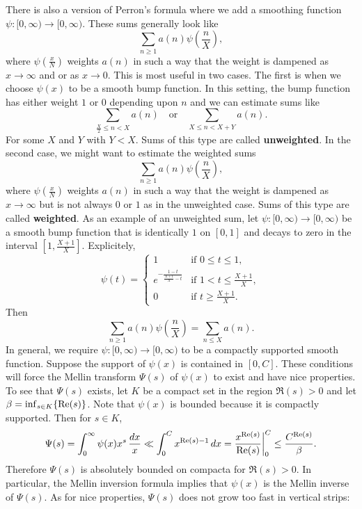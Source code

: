       There is also a version of Perron's formula where we add a smoothing function $\psi:[0,\infty) \to [0,\infty)$. These sums generally look like
      \[
        \sum_{n \ge 1}a(n)\psi\left(\frac{n}{X}\right),
      \]
      where $\psi\left(\frac{x}{N}\right)$ weights $a(n)$ in such a way that the weight is dampened as $x \to \infty$ and or as $x \to 0$. This is most useful in two cases. The first is when we choose $\psi(x)$ to be a smooth bump function. In this setting, the bump function has either weight $1$ or $0$ depending upon $n$ and we can estimate sums like
      \[
        \sum_{\frac{X}{2} \le n < X}a(n) \quad \text{or} \quad \sum_{X \le n < X+Y}a(n).
      \]
      For some $X$ and $Y$ with $Y < X$. Sums of this type are called \textbf{unweighted}. In the second case, we might want to estimate the weighted sums
      \[
        \sum_{n \ge 1}a(n)\psi\left(\frac{n}{X}\right),
      \]
      where $\psi\left(\frac{x}{N}\right)$ weights $a(n)$ in such a way that the weight is dampened as $x \to \infty$ but is not always $0$ or $1$ as in the unweighted case. Sums of this type are called \textbf{weighted}. As an example of an unweighted sum, let $\psi:[0,\infty) \to [0,\infty)$ be a smooth bump function that is identically $1$ on $[0,1]$ and decays to zero in the interval $\left[1,\frac{X+1}{X}\right]$. Explicitely,
      \[
          \psi(t) = \begin{cases} 1 & \text{if $0 \le t \le 1$}, \\ e^{-\frac{1-t}{\frac{X+1}{X}-t}} & \text{if $1 < t \le \frac{X+1}{X}$}, \\ 0 & \text{if $t \ge \frac{X+1}{X}$}. \end{cases}
      \]
      Then 
      \[
        \sum_{n \ge 1}a(n)\psi\left(\frac{n}{X}\right) = \sum_{n \le X}a(n).
      \]
      In general, we require $\psi:[0,\infty) \to [0,\infty)$ to be a compactly supported smooth function. Suppose the support of $\psi(x)$ is contained in $[0,C]$. These conditions will force the Mellin transform $\Psi(s)$ of $\psi(x)$ to exist and have nice properties. To see that $\Psi(s)$ exists, let $K$ be a compact set in the region $\Re(s) > 0$ and let $\beta = \inf_{s \in K}\{\mathrm{Re}(s)\}$. Note that $\psi(x)$ is bounded because it is compactly supported. Then for $s \in K$,
      \[
        \Psi(s) = \int_{0}^{\infty}\psi(x)x^{s}\,\frac{dx}{x} \ll \int_{0}^{C}x^{\mathrm{Re}(s)-1}\,dx = \frac{x^{\mathrm{Re}(s)}}{\mathrm{Re}(s)}\bigg|_{0}^{C} \le \frac{C^{\mathrm{Re}(s)}}{\beta}.
      \]
      Therefore $\Psi(s)$ is absolutely bounded on compacta for $\Re(s) > 0$. In particular, the Mellin inversion formula implies that $\psi(x)$ is the Mellin inverse of $\Psi(s)$. As for nice properties, $\Psi(s)$ does not grow too fast in vertical strips:

